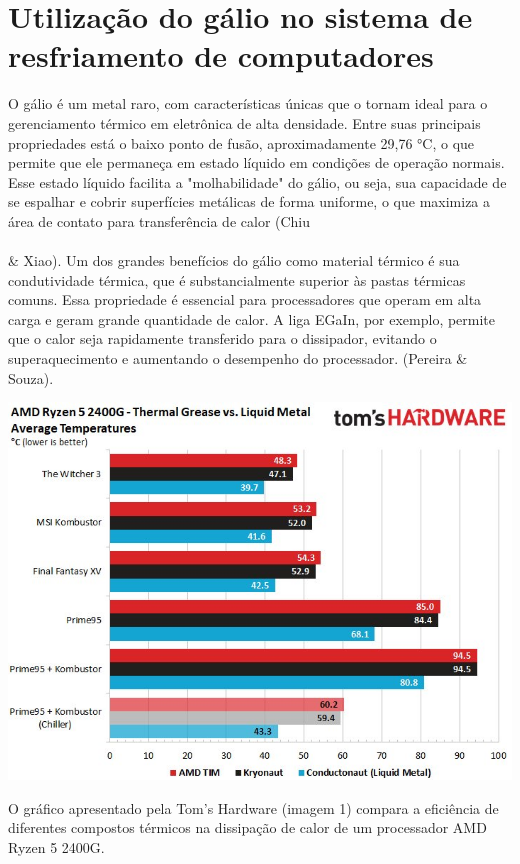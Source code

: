 \documentclass{article}
\begin{document}
\section{Utilização do gálio no sistema de resfriamento de computadores}
O gálio é um metal raro, com características únicas que o tornam ideal para o gerenciamento térmico em eletrônica de alta densidade. Entre suas principais propriedades está o baixo ponto de fusão, aproximadamente 29,76 °C, o que permite que ele permaneça em estado líquido em condições de operação normais. Esse estado líquido facilita a "molhabilidade" do gálio, ou seja, sua capacidade de se espalhar e cobrir superfícies metálicas de forma uniforme, o que maximiza a área de contato para transferência de calor (Chiu \\\\\& Xiao).
Um dos grandes benefícios do gálio como material térmico é sua condutividade térmica, que é substancialmente superior às pastas térmicas comuns. Essa propriedade é essencial para processadores que operam em alta carga e geram grande quantidade de calor. A liga EGaIn, por exemplo, permite que o calor seja rapidamente transferido para o dissipador, evitando o superaquecimento e aumentando o desempenho do processador. (Pereira \& Souza).
\begin{adjustbox}{center,caption={},nofloat=figure,vspace=\bigskipamount}
    \includegraphics[width=15cm]{tio_hardware.jpg}
\end{adjustbox}
O gráfico apresentado pela Tom's Hardware (imagem 1) compara a eficiência de diferentes compostos térmicos na dissipação de calor de um processador AMD Ryzen 5 2400G. 
\end{document}

